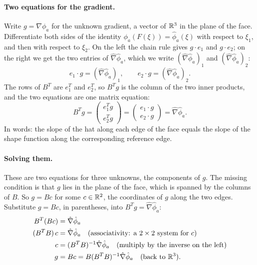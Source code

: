 \paragraph{Two equations for the gradient.} Write $g = \nabla \phi_a$ for the unknown gradient, a vector of $\mathbb{R}^3$ in the plane of the face. Differentiate both sides of the identity $\phi_a(F(\xi)) = \hat\phi_a(\xi)$ with respect to $\xi_1$, and then with respect to $\xi_2$. On the left the chain rule gives $g\cdot e_1$ and $g\cdot e_2$; on the right we get the two entries of $\hat\nabla\hat\phi_a$, which we write $(\hat\nabla\hat\phi_a)_1$ and $(\hat\nabla\hat\phi_a)_2$:
\begin{equation*}
e_1\cdot g = (\hat\nabla\hat\phi_a)_1, \qquad e_2\cdot g = (\hat\nabla\hat\phi_a)_2 .
\end{equation*}
The rows of $B^T$ are $e_1^T$ and $e_2^T$, so $B^T g$ is the column of the two inner products, and the two equations are one matrix equation:
\begin{equation*}
B^T g = \begin{pmatrix} e_1^T g \\ e_2^T g\end{pmatrix} = \begin{pmatrix} e_1 \cdot g \\ e_2\cdot g\end{pmatrix} = \hat\nabla \hat\phi_a .
\end{equation*}
In words: the slope of the hat along each edge of the face equals the slope of the shape function along the corresponding reference edge.

\paragraph{Solving them.} These are two equations for three unknowns, the components of $g$. The missing condition is that $g$ lies in the plane of the face, which is spanned by the columns of $B$. So $g = B c$ for some $c \in \mathbb{R}^2$, the coordinates of $g$ along the two edges. Substitute $g = Bc$, in parentheses, into $B^Tg = \hat\nabla\hat\phi_a$:
\begin{align*}
B^T (B c) &= \hat\nabla \hat\phi_a \\
(B^T B)\, c &= \hat\nabla \hat\phi_a \quad \text{(associativity: a } 2\times 2 \text{ system for } c\text{)} \\
c &= (B^T B)^{-1} \hat\nabla \hat\phi_a \quad \text{(multiply by the inverse on the left)} \\
g &= B c = B (B^T B)^{-1} \hat\nabla \hat\phi_a \quad \text{(back to } \mathbb{R}^3\text{)}.
\end{align*}

